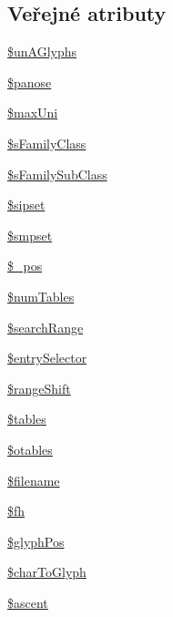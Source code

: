 \subsection*{Veřejné atributy}
\begin{DoxyCompactItemize}
\item 
\hyperlink{class_t_t_font_file_a94264c48c7bd8587af1f0b24df9df9fd}{\$un\-A\-Glyphs}
\item 
\hyperlink{class_t_t_font_file_a9952320e764dbf554bc2cb1c71ed1b35}{\$panose}
\item 
\hyperlink{class_t_t_font_file_af8a3bab707cc25f67f9734c7c922ff19}{\$max\-Uni}
\item 
\hyperlink{class_t_t_font_file_a6a12484724ba327081a2fcf5a93c79c0}{\$s\-Family\-Class}
\item 
\hyperlink{class_t_t_font_file_a486325e6c83c85497008d6d18632c197}{\$s\-Family\-Sub\-Class}
\item 
\hyperlink{class_t_t_font_file_a81e1a350ee3ea588225ba0826d540b83}{\$sipset}
\item 
\hyperlink{class_t_t_font_file_a04cde3d9fa2287dd20434685d7a5c5b4}{\$smpset}
\item 
\hyperlink{class_t_t_font_file_a7dc637ebc4586d378839981deb3660cc}{\$\-\_\-pos}
\item 
\hyperlink{class_t_t_font_file_a44f063773f8730cd90b870b05953f814}{\$num\-Tables}
\item 
\hyperlink{class_t_t_font_file_abcdee3ea5c88e52132578335b54b9bc1}{\$search\-Range}
\item 
\hyperlink{class_t_t_font_file_a498688f98429c7e7538cbee1b4d57f7b}{\$entry\-Selector}
\item 
\hyperlink{class_t_t_font_file_ae285f9718c9eee99cdac8c104467632b}{\$range\-Shift}
\item 
\hyperlink{class_t_t_font_file_aeabef0522b9f6369b9bfb5148a19a8f1}{\$tables}
\item 
\hyperlink{class_t_t_font_file_ab13a17ab1c63ec1b80ba65fb48217698}{\$otables}
\item 
\hyperlink{class_t_t_font_file_a52570f4311514c287c9547e8a0d8f3a3}{\$filename}
\item 
\hyperlink{class_t_t_font_file_a562d0f1cbfc7c313ac6b1ecd0019d88d}{\$fh}
\item 
\hyperlink{class_t_t_font_file_a127c52d52be666c2f3c8f8a2565dfb59}{\$glyph\-Pos}
\item 
\hyperlink{class_t_t_font_file_a915c58b9440a3e133169b19ee341c938}{\$char\-To\-Glyph}
\item 
\hyperlink{class_t_t_font_file_a193fe713998f73391edf5a239d8df0d1}{\$ascent}

\end{DoxyCompactItemize}
